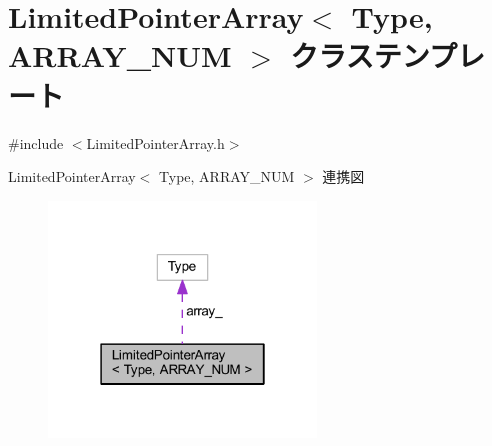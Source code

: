 \hypertarget{class_limited_pointer_array}{}\section{Limited\+Pointer\+Array$<$ Type, A\+R\+R\+A\+Y\+\_\+\+N\+UM $>$ クラステンプレート}
\label{class_limited_pointer_array}


{\ttfamily \#include $<$Limited\+Pointer\+Array.\+h$>$}



Limited\+Pointer\+Array$<$ Type, A\+R\+R\+A\+Y\+\_\+\+N\+UM $>$ 連携図\nopagebreak
\begin{figure}[H]
\begin{center}
\leavevmode
\includegraphics[width=202pt]{class_limited_pointer_array__coll__graph}
\end{center}
\end{figure}
